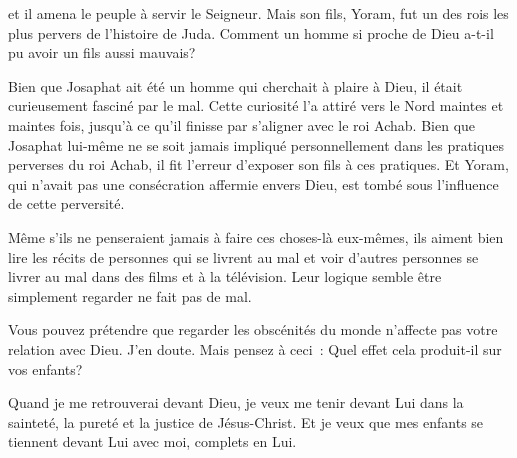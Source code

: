  et il amena le peuple
 à servir le Seigneur. Mais son fils, Yoram, fut un des rois
 les plus pervers de l'histoire de Juda.
 Comment un homme si proche de Dieu a-t-il pu avoir un fils
 aussi mauvais? 

Bien que Josaphat ait été un homme qui cherchait à plaire à Dieu,
 il était curieusement fasciné par le mal.
 Cette curiosité l'a attiré vers le Nord maintes et maintes fois,
 jusqu'à ce qu'il finisse par s'aligner avec le roi Achab.
 Bien que Josaphat lui-même ne se soit jamais impliqué personnellement
 dans les pratiques perverses du roi Achab, il fit l'erreur d'exposer
 son fils à ces pratiques. Et Yoram, qui n'avait pas une consécration
 affermie envers Dieu, est tombé sous l'influence de cette perversité. 


Même s'ils ne penseraient jamais à faire ces choses-là eux-mêmes,
 ils aiment bien lire les récits de personnes qui se livrent au mal
 et voir d'autres personnes se livrer au mal dans des films
 et à la télévision. Leur logique semble être
 \og simplement regarder ne fait pas de mal. \fg{}

Vous pouvez prétendre que regarder les obscénités du monde n'affecte pas
 votre relation avec Dieu. J'en doute. Mais pensez à ceci~:
 Quel effet cela produit-il sur vos enfants? 

Quand je me retrouverai devant Dieu, je veux me tenir devant Lui
 dans la sainteté, la pureté et la justice de Jésus-Christ.
 Et je veux que mes enfants se tiennent devant Lui avec moi,
 complets en Lui. 

\dvrule



